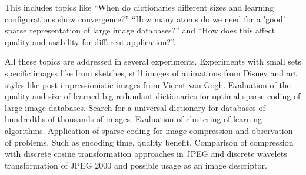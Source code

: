 This includes topics like ``When do dictionaries different sizes and
learning configurations show convergence?'' ``How many atoms do we need  for a
'good' sparse representation of large image databases?''  and ``How does this
affect quality and usability for different application?''. 

All these topics are addressed in several experiments. Experiments with
small sets specific images like from sketches, still images of animations from
Disney and art styles like post-impressionistic images from Vicent van Gogh.
Evaluation of the quality and size of learned big redundant dictionaries for
optimal sparse coding of large image databases. Search for a universal
dictionary for databases of hundredths of thousands of images. Evaluation of
clustering of learning algorithms. Application of sparse coding for image
compression and observation of problems. Such as encoding time, quality benefit.
Comparison of compression with discrete cosine transformation approaches in JPEG
and discrete wavelets transformation of JPEG 2000 and possible usage as an image
descriptor.







